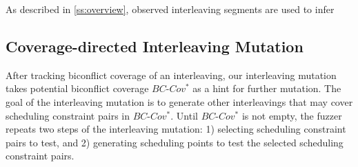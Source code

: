 

%
As described in \autoref{ss:overview}, observed interleaving segments
are used to infer

\dr{}







\subsection{Coverage-directed Interleaving Mutation}
\label{ss:scheduler}

\newcommand{\segment}{segment graph\xspace}
\newcommand{\segments}{segment graphs\xspace}
\newcommand{\Segments}{Segment graphs\xspace}


After tracking biconflict coverage of an interleaving, our
interleaving mutation takes potential biconflict coverage
$BC\mbox{-}Cov^*$ as a hint for further mutation.
%
The goal of the interleaving mutation is to generate other
interleavings that may cover scheduling constraint pairs in
$BC\mbox{-}Cov^*$.
%
Until $BC\mbox{-}Cov^*$ is not empty, the fuzzer repeats two steps of
the interleaving mutation:
%
1) selecting scheduling constraint pairs to test, and
2) generating scheduling points to test the selected scheduling
constraint pairs.


